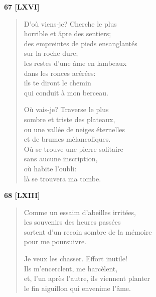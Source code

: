 \bigskip

\begin{center}
  \textbf{67 [LXVI]}
\end{center}

\begin{verse}
  D'où viens-je? Cherche le plus \\
  horrible et âpre des sentiers; \\
  des empreintes de pieds ensanglantés \\
  sur la roche dure; \\
  les restes d'une âme en lambeaux \\
  dans les ronces acérées: \\
  ils te diront le chemin \\
  qui conduit à mon berceau.

  Où vais-je? Traverse le plus \\
  sombre et triste des plateaux, \\
  ou une vallée de neiges éternelles \\
  et de brumes mélancoliques. \\
  Où se trouve une pierre solitaire \\
  sans aucune inscription, \\
  où habite l'oubli: \\
  là se trouvera ma tombe.
\end{verse}


\begin{center}
  \textbf{68 [LXIII]}
\end{center}

\begin{verse}
  Comme un essaim d'abeilles irritées, \\
  les souvenirs des heures passées \\
  sortent d'un recoin sombre de la mémoire \\
  pour me poursuivre.

  Je veux les chasser. Effort inutile! \\
  Ils m'encerclent, me harcèlent, \\
  et, l'un après l'autre, ils viennent planter \\
  le fin aiguillon qui envenime l'âme.
\end{verse}

